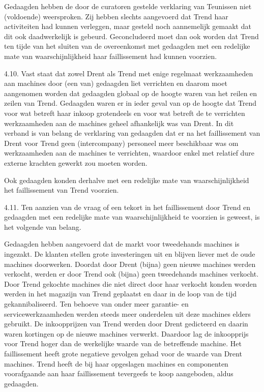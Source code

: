 \documentclass[
  dutch,
  a4paper,
]{article}
\begin{document}
Gedaagden hebben de door de curatoren gestelde verklaring van Teunissen niet (voldoende) weersproken. Zij hebben slechts aangevoerd dat Trend haar activiteiten had kunnen verleggen, maar gesteld noch aannemelijk gemaakt dat dit ook daadwerkelijk is gebeurd. Geconcludeerd moet dan ook worden dat Trend ten tijde van het sluiten van de overeenkomst met gedaagden met een redelijke mate van waarschijnlijkheid haar faillissement had kunnen voorzien.

4.10. Vast staat dat zowel Drent als Trend met enige regelmaat werkzaamheden aan machines door (een van) gedaagden liet verrichten en daarom moet aangenomen worden dat gedaagden globaal op de hoogte waren van het reilen en zeilen van Trend. Gedaagden waren er in ieder geval van op de hoogte dat Trend voor wat betreft haar inkoop grotendeels en voor wat betreft de te verrichten werkzaamheden aan de machines geheel afhankelijk was van Drent. In dit verband is van belang de verklaring van gedaagden dat er na het faillissement van Drent voor Trend geen (intercompany) personeel meer beschikbaar was om werkzaamheden aan de machines te verrichten, waardoor enkel met relatief dure externe krachten gewerkt zou moeten worden.

Ook gedaagden konden derhalve met een redelijke mate van waarschijnlijkheid het faillissement van Trend voorzien.

4.11. Ten aanzien van de vraag of een tekort in het faillissement door Trend en gedaagden met een redelijke mate van waarschijnlijkheid te voorzien is geweest, is het volgende van belang.

Gedaagden hebben aangevoerd dat de markt voor tweedehands machines is ingezakt. De klanten stellen grote investeringen uit en blijven liever met de oude machines doorwerken. Doordat door Drent (bijna) geen nieuwe machines werden verkocht, werden er door Trend ook (bijna) geen tweedehands machines verkocht. Door Trend gekochte machines die niet direct door haar verkocht konden worden werden in het magazijn van Trend geplaatst en daar in de loop van de tijd gekannibaliseerd. Ten behoeve van onder meer garantie- en servicewerkzaamheden werden steeds meer onderdelen uit deze machines elders gebruikt. De inkoopprijzen van Trend werden door Drent gedicteerd en daarin waren kortingen op de nieuwe machines verwerkt. Daardoor lag de inkoopprijs voor Trend hoger dan de werkelijke waarde van de betreffende machine. Het faillissement heeft grote negatieve gevolgen gehad voor de waarde van Drent machines. Trend heeft de bij haar opgeslagen machines en componenten voorafgaande aan haar faillissement tevergeefs te koop aangeboden, aldus gedaagden.
\end{document}
